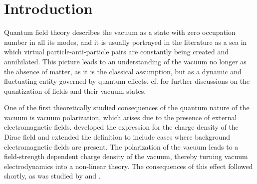 %
%

\chapter{Introduction}

Quantum field theory describes the vacuum as a state with zero occupation number in all its modes, and it is usually portrayed in the literature as a sea in which virtual particle-anti-particle pairs are constantly being created and annihilated. This picture leads to an understanding of the vacuum no longer as the absence of matter, as it is the classical assumption, but as a dynamic and fluctuating entity governed by quantum effects. cf. \cite{Peskin:1995ev, srednicki} for further discussions on the quantization of fields and their vacuum states.

One of the first theoretically studied consequences of the quantum nature of the vacuum is vacuum polarization, which arises due to the presence of external electromagnetic fields. \cite{Dirac1934} developed the expression for the charge density of the Dirac field and extended the definition to include cases where background electromagnetic fields are present. 
The polarization of the vacuum leads to a field-strength dependent charge density of the vacuum, thereby turning vacuum electrodynamics into a non-linear theory. The consequences of this effect followed shortly, as was studied by \cite{Uehl1935} and \cite{Heis1936}.


